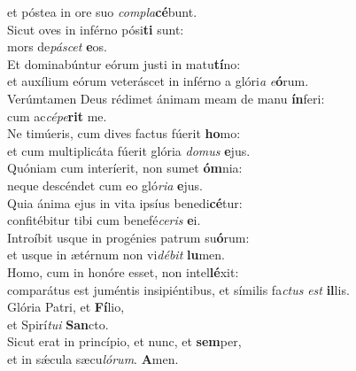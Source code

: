 \oddverse et póstea in ore suo \textit{com}\textit{pla}\textbf{cé}bunt.\\
\evenverse Sicut oves in inférno pósi\textbf{ti} sunt:~\*\\
\evenverse mors de\textit{pá}\textit{scet} \textbf{e}os.\\
\oddverse Et dominabúntur eórum justi in matu\textbf{tí}no:~\*\\
\oddverse et auxílium eórum veteráscet in inférno a glóri\textit{a} \textit{e}\textbf{ó}rum.\\
\evenverse Verúmtamen Deus rédimet ánimam meam de manu \textbf{ín}feri:~\*\\
\evenverse cum ac\textit{cé}\textit{pe}\textbf{rit} me.\\
\oddverse Ne timúeris, cum dives factus fúerit \textbf{ho}mo:~\*\\
\oddverse et cum multiplicáta fúerit glória \textit{do}\textit{mus} \textbf{e}jus.\\
\evenverse Quóniam cum interíerit, non sumet \textbf{óm}nia:~\*\\
\evenverse neque descéndet cum eo gló\textit{ri}\textit{a} \textbf{e}jus.\\
\oddverse Quia ánima ejus in vita ipsíus benedi\textbf{cé}tur:~\*\\
\oddverse confitébitur tibi cum benefé\textit{ce}\textit{ris} \textbf{e}i.\\
\evenverse Introíbit usque in progénies patrum su\textbf{ó}rum:~\*\\
\evenverse et usque in ætérnum non vi\textit{dé}\textit{bit} \textbf{lu}men.\\
\oddverse Homo, cum in honóre esset, non intel\textbf{lé}xit:~\*\\
\oddverse comparátus est juméntis insipiéntibus, et símilis fa\textit{ctus} \textit{est} \textbf{il}lis.\\
\evenverse Glória Patri, et \textbf{Fí}lio,~\*\\
\evenverse et Spirí\textit{tu}\textit{i} \textbf{San}cto.\\
\oddverse Sicut erat in princípio, et nunc, et \textbf{sem}per,~\*\\
\oddverse et in sǽcula sæcu\textit{ló}\textit{rum}. \textbf{A}men.\\

